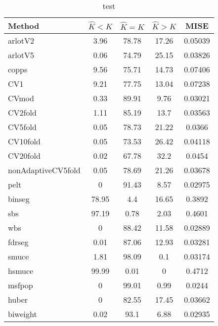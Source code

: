 \begin{table}[ht]
\centering
\begin{tabular}{l|cccc}
  \hline
Method & $\hat{K} < K$ & $\hat{K} = K$ & $\hat{K} > K$ & MISE \\ 
  \hline
arlotV2 &  3.96 & 78.78 & 17.26 & 0.05039 \\ 
  arlotV5 &  0.06 & 74.79 & 25.15 & 0.03826 \\ 
  copps &  9.56 & 75.71 & 14.73 & 0.07406 \\ 
  CV1 &  9.21 & 77.75 & 13.04 & 0.07238 \\ 
  CVmod &  0.33 & 89.91 &  9.76 & 0.03021 \\ 
  CV2fold &  1.11 & 85.19 &  13.7 & 0.03563 \\ 
  CV5fold &  0.05 & 78.73 & 21.22 & 0.0366 \\ 
  CV10fold &  0.05 & 73.53 & 26.42 & 0.04118 \\ 
  CV20fold &  0.02 & 67.78 &  32.2 & 0.0454 \\ 
  nonAdaptiveCV5fold &  0.05 & 78.69 & 21.26 & 0.03678 \\ 
  pelt &     0 & 91.43 &  8.57 & 0.02975 \\ 
  binseg & 78.95 &   4.4 & 16.65 & 0.3892 \\ 
  sbs & 97.19 &  0.78 &  2.03 & 0.4601 \\ 
  wbs &     0 & 88.42 & 11.58 & 0.02889 \\ 
  fdrseg &  0.01 & 87.06 & 12.93 & 0.03281 \\ 
  smuce &  1.81 & 98.09 &   0.1 & 0.03174 \\ 
  hsmuce & 99.99 &  0.01 &     0 & 0.4712 \\ 
  msfpop &     0 & 99.01 &  0.99 & 0.0244 \\ 
  huber &     0 & 82.55 & 17.45 & 0.03662 \\ 
  biweight &  0.02 &  93.1 &  6.88 & 0.02935 \\ 
   \hline
\end{tabular}
\caption{test} 
\end{table}
